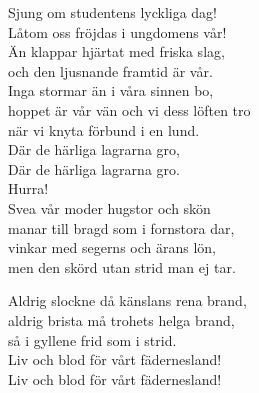 \documentclass[a6paper,10pt]{article}
\begin{document}
\begin{center}
\end{center}
\begin{lyrics}
Sjung om studentens lyckliga dag!\\
Låtom oss fröjdas i ungdomens vår!\\
Än klappar hjärtat med friska slag,\\
och den ljusnande framtid är vår.
\vspace{5pt}\\
Inga stormar än i våra sinnen bo,\\
hoppet är vår vän och vi dess löften tro\\
när vi knyta förbund i en lund.\\
Där de härliga lagrarna gro,\\
Där de härliga lagrarna gro.\\
Hurra!
\vspace{5pt}\\
Svea vår moder hugstor och skön\\
manar till bragd som i fornstora dar,\\
vinkar med segerns och ärans lön,\\
men den skörd utan strid man ej tar.

\setlength{\oddsidemargin}{-0.37in}
\noindent
Aldrig slockne då känslans rena brand,\\
aldrig brista må trohets helga brand,\\
så i gyllene frid som i strid.\\
Liv och blod för vårt fädernesland!\\
Liv och blod för vårt fädernesland!
\end{lyrics}
\vspace{20pt} 
\end{document}
